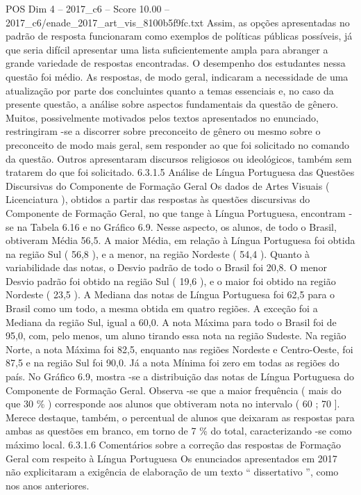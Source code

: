 \begin{textsample}{POS Dim 4 – 2017\_c6 – Score 10.00 – 2017\_c6/enade\_2017\_art\_vis\_8100b5f9fc.txt}
Assim, as opções apresentadas no padrão de resposta funcionaram como exemplos de políticas públicas possíveis, já que seria difícil apresentar uma lista suficientemente ampla para abranger a grande variedade de respostas encontradas.
O desempenho dos estudantes nessa questão foi médio.
As respostas, de modo geral, indicaram a necessidade de uma atualização por parte dos concluintes quanto a temas essenciais e, no caso da presente questão, a análise sobre aspectos fundamentais da questão de gênero.
Muitos, possivelmente motivados pelos textos apresentados no enunciado, restringiram -se a discorrer sobre preconceito de gênero ou mesmo sobre o preconceito de modo mais geral, sem responder ao que foi solicitado no comando da questão.
Outros apresentaram discursos religiosos ou ideológicos, também sem tratarem do que foi solicitado. 6.3.1.5 Análise de Língua Portuguesa das Questões Discursivas do Componente de Formação Geral Os dados de Artes Visuais ( Licenciatura ), obtidos a partir das respostas às questões discursivas do Componente de Formação Geral, no que tange à Língua Portuguesa, encontram -se na Tabela 6.16 e no Gráfico 6.9.
Nesse aspecto, os alunos, de todo o Brasil, obtiveram Média 56,5.
A maior Média, em relação à Língua Portuguesa foi obtida na região Sul ( 56,8 ), e a menor, na região Nordeste ( 54,4 ).
Quanto à variabilidade das notas, o Desvio padrão de todo o Brasil foi 20,8.
O menor Desvio padrão foi obtido na região Sul ( 19,6 ), e o maior foi obtido na região Nordeste ( 23,5 ).
A Mediana das notas de Língua Portuguesa foi 62,5 para o Brasil como um todo, a mesma obtida em quatro regiões.
A exceção foi a Mediana da região Sul, igual a 60,0.
A nota Máxima para todo o Brasil foi de 95,0, com, pelo menos, um aluno tirando essa nota na região Sudeste.
Na região Norte, a nota Máxima foi 82,5, enquanto nas regiões Nordeste e Centro-Oeste, foi 87,5 e na região Sul foi 90,0.
Já a nota Mínima foi zero em todas as regiões do país.
No Gráfico 6.9, mostra -se a distribuição das notas de Língua Portuguesa do Componente de Formação Geral.
Observa -se que a maior frequência ( mais do que 30 \% ) corresponde aos alunos que obtiveram nota no intervalo ( 60 ; 70 ].
Merece destaque, também, o percentual de alunos que deixaram as respostas para ambas as questões em branco, em torno de 7 \% do total, caracterizando -se como máximo local. 6.3.1.6 Comentários sobre a correção das respostas de Formação Geral com respeito à Língua Portuguesa Os enunciados apresentados em 2017 não explicitaram a exigência de elaboração de um texto “ dissertativo ”, como nos anos anteriores.

\end{textsample}
